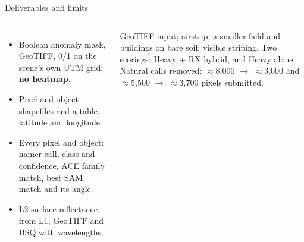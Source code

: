 \documentclass[aspectratio=169,10pt]{beamer}
\newcommand{\tx}[1]{{\fontsize{6.6}{7.9}\selectfont #1\par}}
\begin{document}
\begin{frame}{Deliverables and limits}
\begin{columns}[T,onlytextwidth]
\par\vspace{0.2mm}
\begin{itemize}\setlength{\itemsep}{0.2mm}\fontsize{6.4}{7.6}\selectfont
\item Boolean anomaly mask, GeoTIFF, 0/1 on the scene's own UTM grid; \textbf{no heatmap}.
\item Pixel and object shapefiles and a table, latitude and longitude.
\item Every pixel and object: namer call, class and confidence, ACE family match, best SAM match and its angle.
\item L2 surface reflectance from L1, GeoTIFF and BSQ with wavelengths.
\end{itemize}
\vspace{0.8mm}
\par\vspace{0.2mm}
\par
\par\vspace{0.2mm}
\tx{GeoTIFF input; airstrip, a smaller field and buildings on bare soil; visible striping. Two scorings: Heavy + RX hybrid, and Heavy alone. Natural calls removed: $\approx$8,000 $\to$ $\approx$3,000 and $\approx$5,500 $\to$ $\approx$3,700 pixels submitted.}
\vspace{0.4mm}

\end{columns}
\end{frame}
\end{document}
